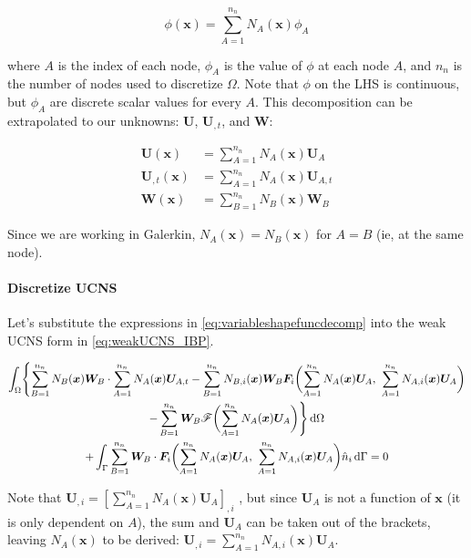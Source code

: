 \documentclass[11pt, letterpaper, twoside]{article}
\renewcommand{\vec}[1]{\bm{#1}}
\newcommand{\U}{\vec{U}}
\newcommand{\F}{\vec{F}}
\newcommand{\W}{\vec{W}}
\newcommand{\x}{\vec{x}}
\newcommand{\NAx}{N_A(\x)}
\newcommand{\NBx}{N_B(\x)}
\newcommand{\NAix}{N_{A,i}(\x)}
\newcommand{\NBix}{N_{B,i}(\x)}
\newcommand{\sumA}[1]{\sum_{A=1}^{#1}}
\newcommand{\sumB}[1]{\sum_{B=1}^{#1}}
\newcommand{\src}{\vec{\mathscr{F}}}
\begin{document}
        \begin{equation}
            \phi(\x) = \sum_{A=1}^{n_n} N_A(\x) \phi_A
        \end{equation}

        where \(A\) is the index of each node, \(\phi_A\) is the value of \(\phi\) at each node \(A\), and \(n_n\) is the number of nodes used to discretize \(\Omega\). Note that \(\phi\) on the LHS is continuous, but \(\phi_A\) are discrete scalar values for every \(A\). This decomposition can be extrapolated to our unknowns: \(\U\), \(\U_{,t}\), and \(\W\):

        \begin{subequations}
            \label{eq:variableshapefuncdecomp}
           \begin{align}
                \U(\x) &= \sum_{A=1}^{n_n} N_A(\x) \U_A \\
                \U_{,t}(\x) &= \sum_{A=1}^{n_n} N_A(\x) \U_{A,t} \\
                \W(\x) &= \sum_{B=1}^{n_n} N_B(\x) \W_B 
           \end{align} 
        \end{subequations}

        Since we are working in Galerkin, \(N_A(\x) = N_B(\x) \) for \(A=B\) (ie, at the same node). 

        \paragraph{Discretize UCNS}
            Let's substitute the expressions in \cref{eq:variableshapefuncdecomp} into the weak UCNS form in \cref{eq:weakUCNS_IBP}.

            \begin{multline}
                \int_\Omega \Biggl\{ \sumB{n_n} \NBx \W_B \cdot \sumA{n_n} \NAx \U_{A,t} 
                - \sumB{n_n} \NBix \W_B \F_i \biggl(\sumA{n_n} \NAx \U_A,\ \sumA{n_n} \NAix \U_A\biggr) \\
                - \sumB{n_n} \W_B \src\biggl(\sumA{n_n} \NAx \U_A \biggr) \Biggr\} \dif \Omega \\
                + \int_\Gamma \sumB{n_n} \W_B \cdot \F_i\biggl(\sumA{n_n} \NAx \U_A,\ \sumA{n_n} \NAix \U_A\biggr) \hat n_i \dif \Gamma = 0
            \end{multline}

            Note that \(\U_{,i} = [\sumA{n_n} \NAx \U_A]_{,i}\) , but since \(\U_A\) is not a function of \(\x\) (it is only dependent on \(A\)), the sum and \(\U_A\) can be taken out of the brackets, leaving \(\NAx\) to be derived: \(\U_{,i} = \sumA{n_n} \NAix \U_A\).
\end{document}
